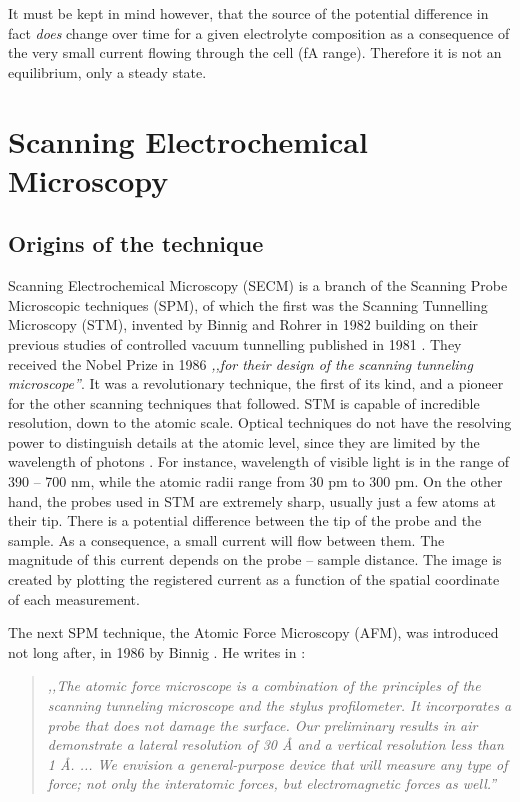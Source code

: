 It must be kept in mind however, that the source of the potential difference in fact \emph{does} change over time for a given electrolyte composition as a consequence of the very small current flowing through the cell (fA range). Therefore it is not an equilibrium, only a steady state.
\newpage
\section{Scanning Electrochemical Microscopy}
\subsection{Origins of the technique}
Scanning Electrochemical Microscopy (SECM) is a branch of the Scanning Probe Microscopic techniques (SPM), of which the first was the Scanning Tunnelling Microscopy (STM), invented by Binnig and Rohrer in 1982\cite{binnig1982surface} building on their previous studies of controlled vacuum tunnelling published in 1981 \cite{binnig1982physica, binnig1982tunneling}.
They received the Nobel Prize in 1986 \emph{,,for their design of the scanning tunneling microscope''}.
It was a revolutionary technique, the first of its kind, and a pioneer for the other scanning techniques that followed.
STM is capable of incredible resolution, down to the atomic scale.
Optical techniques do not have the resolving power to distinguish details at the atomic level, since they are limited by the wavelength of photons \cite{abbe1873beitrage}.
For instance, wavelength of visible light is in the range of 390 -- 700 nm, while the atomic radii range from 30 pm to 300 pm.
On the other hand, the probes used in STM are extremely sharp, usually just a few atoms at their tip.
There is a potential difference between the tip of the probe and the sample.
As a consequence, a small current will flow between them.
The magnitude of this current depends on the probe -- sample distance.
The image is created by plotting the registered current as a function of the spatial coordinate of each measurement.

The next SPM technique, the Atomic Force Microscopy (AFM), was introduced not long after, in 1986 by Binnig \cite{binnig1986atomic, bennig1988atomic}.
He writes in \cite{binnig1986atomic}:

\begin{quote}
\vspace{0.5cm}
\emph{,,The atomic force microscope is a combination of the principles of the scanning tunneling microscope and the stylus profilometer.
It incorporates a probe that does not damage the surface.
Our preliminary results in air demonstrate a lateral resolution of 30 \AA $ $ and a vertical resolution less than 1  \AA. ...
We envision a general-purpose device that will measure any type of force; not only the interatomic forces, but electromagnetic forces as well.''}
\vspace{0.5cm}
\end{quote}


